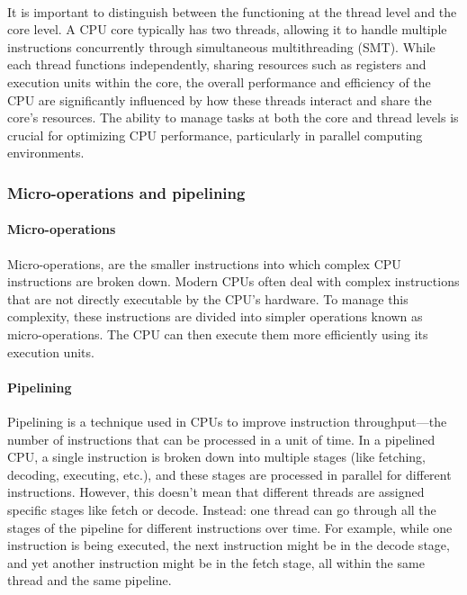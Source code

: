     \paragraph*{}
    It is important to distinguish between the functioning at the thread level and the core level. 
    A CPU core typically has two threads, allowing it to handle multiple instructions concurrently through 
    simultaneous multithreading (SMT). While each thread functions independently, sharing resources such as 
    registers and execution units within the core, the overall performance and efficiency of the CPU are significantly 
    influenced by how these threads interact and share the core’s resources. The ability to manage tasks at both the 
    core and thread levels is crucial for optimizing CPU performance, particularly in parallel computing environments.
    \par


\subsubsection{Micro-operations and pipelining}

    \paragraph*{Micro-operations} 
    Micro-operations, are the smaller instructions into which complex CPU
    instructions are broken down. Modern CPUs often deal with complex instructions that are not directly 
    executable by the CPU’s hardware. To manage this complexity, these instructions are divided into simpler 
    operations known as micro-operations. The CPU can then execute them more efficiently using its execution units.
    \par
    
    \paragraph*{Pipelining} 
    Pipelining is a technique used in CPUs to improve instruction throughput—the number of 
    instructions that can be processed in a unit of time. In a pipelined CPU, a single instruction is broken down into multiple 
    stages (like fetching, decoding, executing, etc.), and these stages are processed in parallel for different instructions. 
    However, this doesn't mean that different threads are assigned specific stages like fetch or decode. Instead: one thread can go 
    through all the stages of the pipeline for different instructions over time. For example, while one instruction is being 
    executed, the next instruction might be in the decode stage, and yet another instruction might be in the fetch stage, all 
    within the same thread and the same pipeline.
    \par



